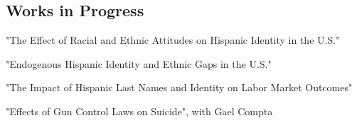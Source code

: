\documentclass[10pt,letterpaper]{article}
\renewenvironment{itemize}{
  \begin{list}{}{
    \setlength{\leftmargin}{1.5em}
  }
}{
  \end{list}
}
\begin{document}
\subsection*{Works in Progress}
%
\begin{itemize}

\item "The Effect of Racial and Ethnic Attitudes on Hispanic Identity in the U.S."
\item "Endogenous Hispanic Identity and Ethnic Gaps in the U.S."
\item "The Impact of Hispanic Last Names and Identity on Labor Market Outcomes"
\item "Effects of Gun Control Laws on Suicide", with Gael Compta

\end{itemize}
%
%
\end{document}
